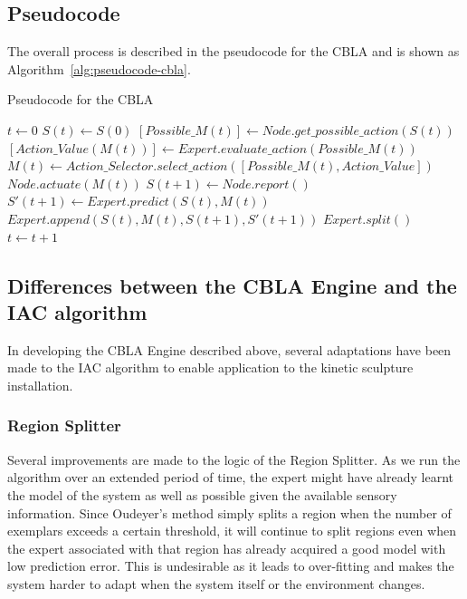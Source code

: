 \subsection{Pseudocode}
	
The overall process is described in the pseudocode for the CBLA and is shown as Algorithm~\ref{alg:pseudocode-cbla}.
\begin{algorithm}[H]
	\caption{Pseudocode for the CBLA} 
	\label{alg:pseudocode-cbla}
	\begin{algorithmic} [1]
		\State $t\gets 0$
		\State $S(t)\gets S(0)$
		\Loop
			\State $[Possible\_M(t)] \gets Node.get\_possible\_action(S(t)) $
			\State $[Action\_Value(M(t))] \gets Expert.evaluate\_action(Possible\_M(t))$
			\State $M(t) \gets Action\_Selector.select\_action([Possible\_M(t), Action\_Value]) $
			\State $Node.actuate(M(t)) $
			\State $S(t+1) \gets Node.report()$
			\State $S'(t+1) \gets Expert.predict(S(t), M(t))$
			\State $Expert.append(S(t), M(t), S(t+1), S'(t+1))$
			\State $Expert.split()$
			\State $t \gets t + 1 $
		\EndLoop
	\end{algorithmic}
\end{algorithm}


\subsection{Differences between the CBLA Engine and the IAC algorithm}

In developing the CBLA Engine described above, several adaptations have been made to the IAC algorithm to enable application to the kinetic sculpture installation. 

\subsubsection{Region Splitter}

Several improvements are made to the logic of the Region Splitter. As we run the algorithm over an extended period of time, the expert might have already learnt the model of the system as well as possible given the available sensory information. Since Oudeyer's method simply splits a region when the number of exemplars exceeds a certain threshold, it will continue to split regions even when the expert associated with that region has already acquired a good model with low prediction error. This is undesirable as it leads to over-fitting and makes the system harder to adapt when the system itself or the environment changes. 

